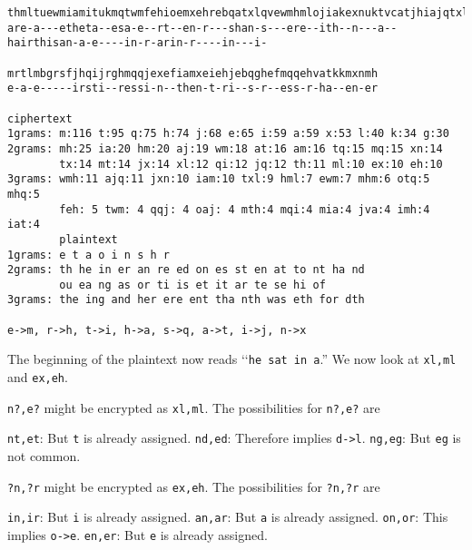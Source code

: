 \begin{Verbatim}[frame=single,fontsize=\tiny]
thmltuewmiamitukmqtwmfehioemxehrebqatxlqvewmhmlojiakexnuktvcatjhiajqtxltumkkeojxnhethjxnhbrukjxnwejv
are-a---etheta--esa-e--rt--en-r---shan-s---ere--ith--n---a--hairthisan-a-e----in-r-arin-r----in---i-

mrtlmbgrsfjhqijrghmqqjexefiamxeiehjebqghefmqqehvatkkmxnmh
e-a-e-----irsti--ressi-n--then-t-ri--s-r--ess-r-ha--en-er

ciphertext
1grams: m:116 t:95 q:75 h:74 j:68 e:65 i:59 a:59 x:53 l:40 k:34 g:30
2grams: mh:25 ia:20 hm:20 aj:19 wm:18 at:16 am:16 tq:15 mq:15 xn:14
        tx:14 mt:14 jx:14 xl:12 qi:12 jq:12 th:11 ml:10 ex:10 eh:10
3grams: wmh:11 ajq:11 jxn:10 iam:10 txl:9 hml:7 ewm:7 mhm:6 otq:5 mhq:5
        feh: 5 twm: 4 qqj: 4 oaj: 4 mth:4 mqi:4 mia:4 jva:4 imh:4 iat:4
        plaintext
1grams: e t a o i n s h r
2grams: th he in er an re ed on es st en at to nt ha nd
        ou ea ng as or ti is et it ar te se hi of
3grams: the ing and her ere ent tha nth was eth for dth

e->m, r->h, t->i, h->a, s->q, a->t, i->j, n->x
  \end{Verbatim}

The beginning of the plaintext now reads \lq\lq\verb!he sat in a!.''
We now look at \verb!xl,ml! and
\verb!ex,eh!.

\verb!n?,e?! might be encrypted as \verb!xl,ml!.
The possibilities for \verb!n?,e?! are
\begin{tightlist}
  \li \verb!nt,et!: But \verb!t! is already assigned.
  \li \verb!nd,ed!: Therefore implies \verb!d->l!.
  \li \verb!ng,eg!: But \verb!eg! is not common.
\end{tightlist}

\verb!?n,?r! might be encrypted as \verb!ex,eh!.
The possibilities for \verb!?n,?r! are
\begin{tightlist}
  \li \verb!in,ir!: But \verb!i! is already assigned.
  \li \verb!an,ar!: But \verb!a! is already assigned.
  \li \verb!on,or!: This implies \verb!o->e!.
  \li \verb!en,er!: But \verb!e! is already assigned.
\end{tightlist}

